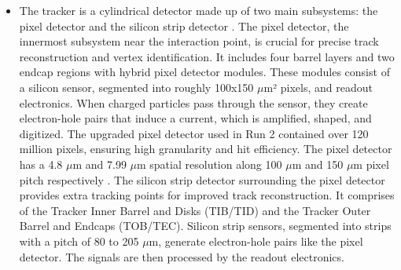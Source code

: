 \begin{itemize}
\item The tracker is a cylindrical detector made up of two main subsystems: the pixel detector and the silicon strip detector \cite{CMS:2021ime}. The pixel detector, the innermost subsystem near the interaction point, is crucial for precise track reconstruction and vertex identification. It includes four barrel layers and two endcap regions with hybrid pixel detector modules. These modules consist of a silicon sensor, segmented into roughly 100x150 $\mu$m² pixels, and readout electronics. When charged particles pass through the sensor, they create electron-hole pairs that induce a current, which is amplified, shaped, and digitized. The upgraded pixel detector used in Run 2 contained over 120 million pixels, ensuring high granularity and hit efficiency. The pixel detector has a 4.8 $\mu$m  and 7.99 $\mu$m  spatial resolution along 100 $\mu$m and 150 $\mu$m pixel pitch respectively \cite{Dragicevic:2262932}. The silicon strip detector surrounding the pixel detector provides extra tracking points for improved track reconstruction. It comprises of the Tracker Inner Barrel and Disks (TIB/TID) and the Tracker Outer Barrel and Endcaps (TOB/TEC). Silicon strip sensors, segmented into strips with a pitch of 80 to 205 $\mu$m, generate electron-hole pairs like the pixel detector. The signals are then processed by the readout electronics.


\end{itemize}

